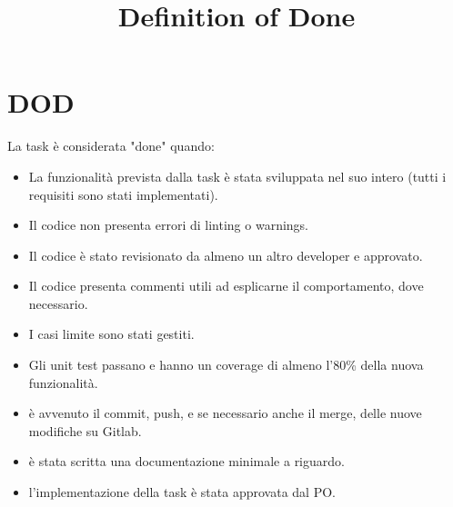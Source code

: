 \documentclass{article}
\title{Definition of Done}
\author{}
\date{}
\begin{document}
\maketitle

\section*{DOD}
La task è considerata "done" quando:
\begin{itemize}[leftmargin=*]
    \item La funzionalità prevista dalla task è stata sviluppata nel suo intero (tutti i requisiti sono stati implementati).
    \item Il codice non presenta errori di linting o warnings.
    \item Il codice è stato revisionato da almeno un altro developer e approvato.
    \item Il codice presenta commenti utili ad esplicarne il comportamento, dove necessario.
    \item I casi limite sono stati gestiti.
    \item Gli unit test passano e hanno un coverage di almeno l'80\% della nuova funzionalità.
    \item è avvenuto il commit, push, e se necessario anche il merge, delle nuove modifiche su Gitlab.
    \item è stata scritta una documentazione minimale a riguardo.
    \item l'implementazione della task è stata approvata dal PO.
\end{itemize}
\end{document}
